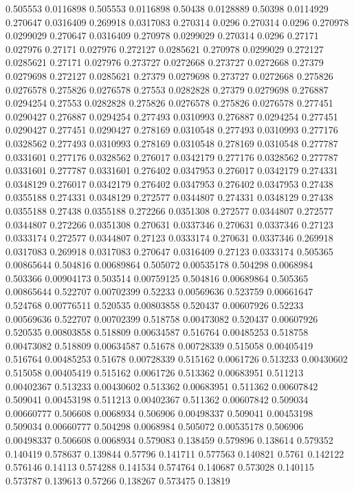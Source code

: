 0.505553 0.0116898
0.505553 0.0116898
0.50438 0.0128889
0.50398 0.0114929
0.270647 0.0316409
0.269918 0.0317083
0.270314 0.0296
0.270314 0.0296
0.270978 0.0299029
0.270647 0.0316409
0.270978 0.0299029
0.270314 0.0296
0.27171 0.027976
0.27171 0.027976
0.272127 0.0285621
0.270978 0.0299029
0.272127 0.0285621
0.27171 0.027976
0.273727 0.0272668
0.273727 0.0272668
0.27379 0.0279698
0.272127 0.0285621
0.27379 0.0279698
0.273727 0.0272668
0.275826 0.0276578
0.275826 0.0276578
0.27553 0.0282828
0.27379 0.0279698
0.276887 0.0294254
0.27553 0.0282828
0.275826 0.0276578
0.275826 0.0276578
0.277451 0.0290427
0.276887 0.0294254
0.277493 0.0310993
0.276887 0.0294254
0.277451 0.0290427
0.277451 0.0290427
0.278169 0.0310548
0.277493 0.0310993
0.277176 0.0328562
0.277493 0.0310993
0.278169 0.0310548
0.278169 0.0310548
0.277787 0.0331601
0.277176 0.0328562
0.276017 0.0342179
0.277176 0.0328562
0.277787 0.0331601
0.277787 0.0331601
0.276402 0.0347953
0.276017 0.0342179
0.274331 0.0348129
0.276017 0.0342179
0.276402 0.0347953
0.276402 0.0347953
0.27438 0.0355188
0.274331 0.0348129
0.272577 0.0344807
0.274331 0.0348129
0.27438 0.0355188
0.27438 0.0355188
0.272266 0.0351308
0.272577 0.0344807
0.272577 0.0344807
0.272266 0.0351308
0.270631 0.0337346
0.270631 0.0337346
0.27123 0.0333174
0.272577 0.0344807
0.27123 0.0333174
0.270631 0.0337346
0.269918 0.0317083
0.269918 0.0317083
0.270647 0.0316409
0.27123 0.0333174
0.505365 0.00865644
0.504816 0.00689864
0.505072 0.00535178
0.504298 0.0068984
0.503366 0.00904173
0.503514 0.00759125
0.504816 0.00689864
0.505365 0.00865644
0.522707 0.00702399
0.52233 0.00569636
0.523759 0.00661647
0.524768 0.00776511
0.520535 0.00803858
0.520437 0.00607926
0.52233 0.00569636
0.522707 0.00702399
0.518758 0.00473082
0.520437 0.00607926
0.520535 0.00803858
0.518809 0.00634587
0.516764 0.00485253
0.518758 0.00473082
0.518809 0.00634587
0.51678 0.00728339
0.515058 0.00405419
0.516764 0.00485253
0.51678 0.00728339
0.515162 0.0061726
0.513233 0.00430602
0.515058 0.00405419
0.515162 0.0061726
0.513362 0.00683951
0.511213 0.00402367
0.513233 0.00430602
0.513362 0.00683951
0.511362 0.00607842
0.509041 0.00453198
0.511213 0.00402367
0.511362 0.00607842
0.509034 0.00660777
0.506608 0.0068934
0.506906 0.00498337
0.509041 0.00453198
0.509034 0.00660777
0.504298 0.0068984
0.505072 0.00535178
0.506906 0.00498337
0.506608 0.0068934
0.579083 0.138459
0.579896 0.138614
0.579352 0.140419
0.578637 0.139844
0.57796 0.141711
0.577563 0.140821
0.5761 0.142122
0.576146 0.14113
0.574288 0.141534
0.574764 0.140687
0.573028 0.140115
0.573787 0.139613
0.57266 0.138267
0.573475 0.13819

